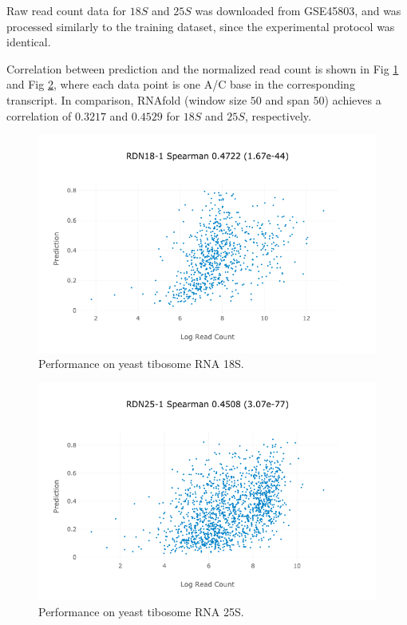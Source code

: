 \documentclass{proposal}
\begin{document}
Raw read count data for $18S$ and $25S$ was downloaded from GSE45803, and was processed similarly to the training dataset,
since the experimental protocol was identical.

Correlation between prediction and the normalized read count is shown in Fig \ref{fig:yeast_r18_performance} and Fig \ref{fig:yeast_r25_performance},
where each data point is one A/C base in the corresponding transcript.
In comparison, RNAfold (window size $50$ and span $50$) achieves a correlation of $0.3217$ and $0.4529$ for $18S$ and $25S$, respectively.

\begin{figure}[h!]
\includegraphics[width=\textwidth]{yeast_r18_performance.png}
\caption{Performance on yeast tibosome RNA 18S.}
\label{fig:yeast_r18_performance}
\centering
\end{figure}

\begin{figure}[h!]
\includegraphics[width=\textwidth]{yeast_r25_performance.png}
\caption{Performance on yeast tibosome RNA 25S.}
\label{fig:yeast_r25_performance}
\centering
\end{figure}
\end{document}
